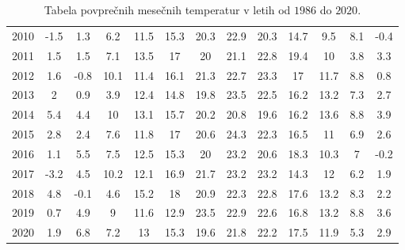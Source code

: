 \documentclass{article}
\begin{document}
\begin{table}[H]
\begin{tabular}{c c c c c c c c c c c c c}
        2010  &  -1.5   &  1.3   &  6.2   &  11.5  &  15.3  &  20.3  &  22.9  &  20.3  &  14.7  &  9.5   &  8.1  &  -0.4   \\                           	
        2011  &  1.5    &  1.5   &  7.1   &  13.5  &  17    &  20    &  21.1  &  22.8  &  19.4  &  10    &  3.8  &  3.3    \\                     	
        2012  &  1.6    &  -0.8  &  10.1  &  11.4  &  16.1  &  21.3  &  22.7  &  23.3  &  17    &  11.7  &  8.8  &  0.8    \\                          
        2013  &  2   	&  0.9   &  3.9   &  12.4  &  14.8  &  19.8  &  23.5  &  22.5  &  16.2  &  13.2  &  7.3  &  2.7    \\                          
        2014  &  5.4    &  4.4   &  10    &  13.1  &  15.7  &  20.2  &  20.8  &  19.6  &  16.2  &  13.6  &  8.8  &  3.9    \\                          	
        2015  &  2.8    &  2.4   &  7.6   &  11.8  &  17    &  20.6  &  24.3  &  22.3  &  16.5  &  11    &  6.9  &  2.6    \\                       	
        2016  &  1.1    &  5.5   &  7.5   &  12.5  &  15.3  &  20    &  23.2  &  20.6  &  18.3  &  10.3  &  7    &  -0.2   \\                        	
        2017  &  -3.2   &  4.5   &  10.2  &  12.1  &  16.9  &  21.7  &  23.2  &  23.2  &  14.3  &  12    &  6.2  &  1.9    \\                          	
        2018  &  4.8    &  -0.1  &  4.6   &  15.2  &  18    &  20.9  &  22.3  &  22.8  &  17.6  &  13.2  &  8.3  &  2.2    \\                          	
        2019  &  0.7    &  4.9   &  9     &  11.6  &  12.9  &  23.5  &  22.9  &  22.6  &  16.8  &  13.2  &  8.8  &  3.6    \\                         	
        2020  &  1.9    &  6.8   &  7.2   &  13    &  15.3  &  19.6  &  21.8  &  22.2  &  17.5  &  11.9  &  5.3  &  2.9    \\                         	
    \end{tabular}
    \caption{Tabela povprečnih mesečnih temperatur v letih od $1986$ do $2020$.}
\end{table}
\end{document}
